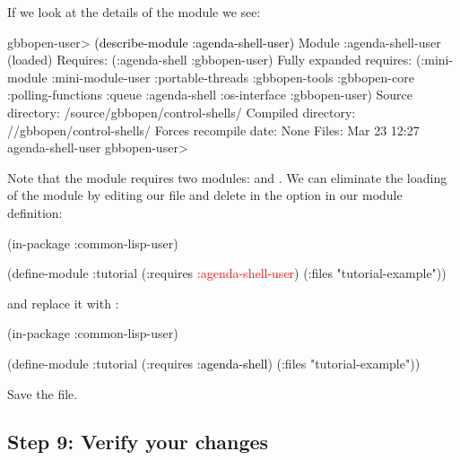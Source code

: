 \documentclass[10pt,twoside,english,pdftex]{article}
\begin{document}
If we look at the details of the  module we see:
%
\W\supp
\begin{example}
\textcolor{darkergray}{%
  gbbopen-user> \textcolor{black}{(describe-module :agenda-shell-user)}
  Module :agenda-shell-user (loaded)
    Requires: (:agenda-shell :gbbopen-user)
    Fully expanded requires: (:mini-module :mini-module-user :portable-threads
                              :gbbopen-tools :gbbopen-core :polling-functions
                              :queue :agenda-shell :os-interface :gbbopen-user)
    Source directory: /source/gbbopen/control-shells/
    Compiled directory: //gbbopen/control-shells/
    Forces recompile date: None
    Files: Mar 23 12:27 agenda-shell-user 
  gbbopen-user>}
\end{example}
%
Note that the  module requires two modules:
 and . We can eliminate the loading of
the  module by editing our  file and
delete  in the  option in our
 module definition:
%
\W\supp\notpretop
\begin{example}
\textcolor{darkergray}{%
  (in-package :common-lisp-user)

  (define-module :tutorial
    (:requires \textcolor{red}{:agenda-shell-user})
    (:files "tutorial-example"))}
\end{example}
%
and replace it with :
%
\W\supp\notpretop
\begin{example}
\textcolor{darkergray}{%
  (in-package :common-lisp-user)

  (define-module :tutorial
    (:requires \textcolor{black}{:agenda-shell})
    (:files "tutorial-example"))}
\end{example}
%
Save the file.

\subsection*{Step 9: Verify your changes}
\end{document}
